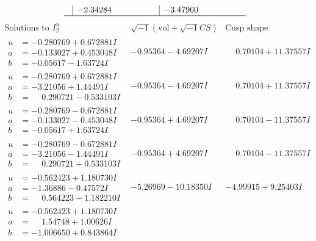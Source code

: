 \documentclass[1p]{elsarticle_modified}
\theoremstyle{definition}
\newcommand{\I}{\sqrt{-1}}
\begin{document}
$$\begin{array}{c|c|c}
 & -2.34284\phantom{ +0.000000I} & -3.47960\phantom{ +0.000000I}\\
 \hline 
 \end{array}$$\newpage$$\begin{array}{c|c|c}  
\text{Solutions to }I^u_{2}& \I (\text{vol} + \sqrt{-1}CS) & \text{Cusp shape}\\
 \hline 
\begin{aligned}
u &= -0.280769 + 0.672881 I \\
a &= -0.133027 + 0.453048 I \\
b &= -0.05617 - 1.63724 I\end{aligned}
 & -0.95364 - 4.69207 I & \phantom{-}0.70104 + 11.37557 I \\ \hline\begin{aligned}
u &= -0.280769 + 0.672881 I \\
a &= -3.21056 + 1.44491 I \\
b &= \phantom{-}0.290721 - 0.533103 I\end{aligned}
 & -0.95364 - 4.69207 I & \phantom{-}0.70104 + 11.37557 I \\ \hline\begin{aligned}
u &= -0.280769 - 0.672881 I \\
a &= -0.133027 - 0.453048 I \\
b &= -0.05617 + 1.63724 I\end{aligned}
 & -0.95364 + 4.69207 I & \phantom{-}0.70104 - 11.37557 I \\ \hline\begin{aligned}
u &= -0.280769 - 0.672881 I \\
a &= -3.21056 - 1.44491 I \\
b &= \phantom{-}0.290721 + 0.533103 I\end{aligned}
 & -0.95364 + 4.69207 I & \phantom{-}0.70104 - 11.37557 I \\ \hline\begin{aligned}
u &= -0.562423 + 1.180730 I \\
a &= -1.36886 - 0.47572 I \\
b &= \phantom{-}0.564223 - 1.182210 I\end{aligned}
 & -5.26969 - 10.18350 I & -4.99915 + 9.25403 I \\ \hline\begin{aligned}
u &= -0.562423 + 1.180730 I \\
a &= \phantom{-}1.54748 + 1.00626 I \\
b &= -1.006650 + 0.843864 I\end{aligned}

\end{array}$$
\end{document}
